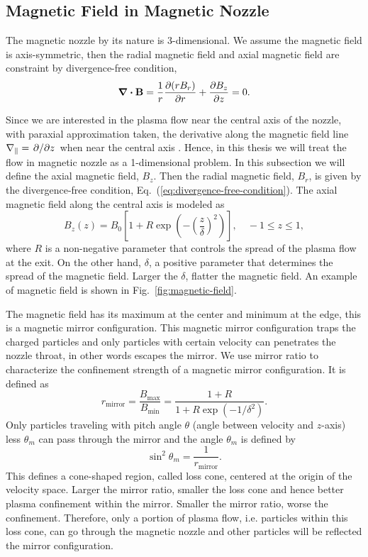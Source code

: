 \subsection{Magnetic Field in Magnetic Nozzle} \label{sec:magnetic-field-in-nozzle}
The magnetic nozzle by its nature is 3-dimensional. We assume the magnetic field is axis-symmetric, then the radial magnetic field and axial magnetic field are constraint by divergence-free condition,
\begin{equation}
	\div\mathbf{B} = \frac{1}{r}\pdv{(rB_r)}{r} + \pdv{B_z}{z} = 0.
	\label{eq:divergence-free-condition}
\end{equation}

Since we are interested in the plasma flow near the central axis of the nozzle, with paraxial approximation taken, the derivative along the magnetic field line $\nabla_\parallel = \pdv*{z}$ when near the central axis \cite{smolyakov_quasineutral_2021}. Hence, in this thesis we will treat the flow in magnetic nozzle as a 1-dimensional problem. In this subsection we will define the axial magnetic field, $B_z$. Then the radial magnetic field, $B_r$, is given by the divergence-free condition, Eq.~(\ref{eq:divergence-free-condition}). The axial magnetic field along the central axis is modeled as
\begin{equation}
	B_z(z) = B_0 \left[1 + R\exp(-\left(\frac{z}{\delta}\right)^2)\right], \quad -1\leq z \leq 1,
\end{equation}
where $R$ is a non-negative parameter that controls the spread of the plasma flow at the exit. On the other hand, $\delta$, a positive parameter that determines the spread of the magnetic field. Larger the $\delta$, flatter the magnetic field. An example of magnetic field is shown in Fig.~\ref{fig:magnetic-field}.

The magnetic field has its maximum at the center and minimum at the edge, this is a magnetic mirror configuration. This magnetic mirror configuration traps the charged particles and only particles with certain velocity can penetrates the nozzle throat, in other words escapes the mirror. We use mirror ratio to characterize the confinement strength of a magnetic mirror configuration. It is defined as
\begin{equation}
	r_{\text{mirror}} = \frac{B_{\text{max}}}{B_{\text{min}}} = \frac{1+R}{1+R\exp(-1/\delta^2)}.
\end{equation}
Only particles traveling with pitch angle $\theta$ (angle between velocity and $z$-axis) less $\theta_m$ can pass through the mirror and the angle $\theta_m$ is defined by \cite{chen_introduction_2016}
\begin{equation}
	\sin^2\theta_m = \frac{1}{r_{\text{mirror}}}.
	\label{eq:loss-cone}
\end{equation}
This defines a cone-shaped region, called loss cone, centered at the origin of the velocity space. Larger the mirror ratio, smaller the loss cone and hence better plasma confinement within the mirror. Smaller the mirror ratio, worse the confinement. Therefore, only a portion of plasma flow, i.e. particles within this loss cone, can go through the magnetic nozzle and other particles will be reflected the mirror configuration.

